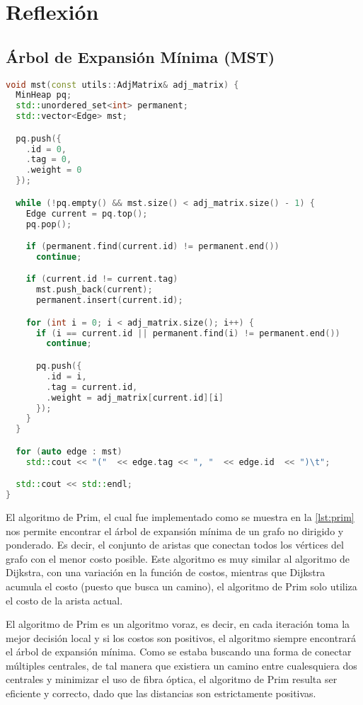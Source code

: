 \documentclass[12pt]{article}
\begin{document}
    \section{Reflexión}
    \subsection{Árbol de Expansión Mínima (MST)}
    \begin{lstlisting}[language=cpp, caption={Algoritmo de Prim}, label={lst:prim}]
void mst(const utils::AdjMatrix& adj_matrix) {
  MinHeap pq;
  std::unordered_set<int> permanent;
  std::vector<Edge> mst;

  pq.push({
    .id = 0,
    .tag = 0,
    .weight = 0
  });

  while (!pq.empty() && mst.size() < adj_matrix.size() - 1) {
    Edge current = pq.top();
    pq.pop();

    if (permanent.find(current.id) != permanent.end())
      continue;

    if (current.id != current.tag)
      mst.push_back(current);
      permanent.insert(current.id);

    for (int i = 0; i < adj_matrix.size(); i++) {
      if (i == current.id || permanent.find(i) != permanent.end())
        continue;

      pq.push({
        .id = i,
        .tag = current.id,
        .weight = adj_matrix[current.id][i]
      });
    }
  }

  for (auto edge : mst)
    std::cout << "("  << edge.tag << ", "  << edge.id  << ")\t";

  std::cout << std::endl;
}
    \end{lstlisting}

    El algoritmo de Prim, el cual fue implementado como se muestra en la \autoref{lst:prim}
    nos permite encontrar el árbol de expansión mínima de un grafo no dirigido y ponderado.
    Es decir, el conjunto de aristas que conectan todos los vértices del grafo con el menor
    costo posible. Este algoritmo es muy similar al algoritmo de Dijkstra, con una variación 
    en la función de costos, mientras que Dijkstra acumula el costo (puesto que busca un camino),
    el algoritmo de Prim solo utiliza el costo de la arista actual.
    
    El algoritmo de Prim es un algoritmo voraz, es decir, en cada iteración toma la mejor decisión
    local y si los costos son positivos, el algoritmo siempre encontrará el árbol de expansión mínima.
    Como se estaba buscando una forma de conectar múltiples centrales, de tal manera que existiera un camino
    entre cualesquiera dos centrales y minimizar el uso de fibra óptica, el algoritmo de Prim resulta ser
    eficiente y correcto, dado que las distancias son estrictamente positivas.
\end{document}
